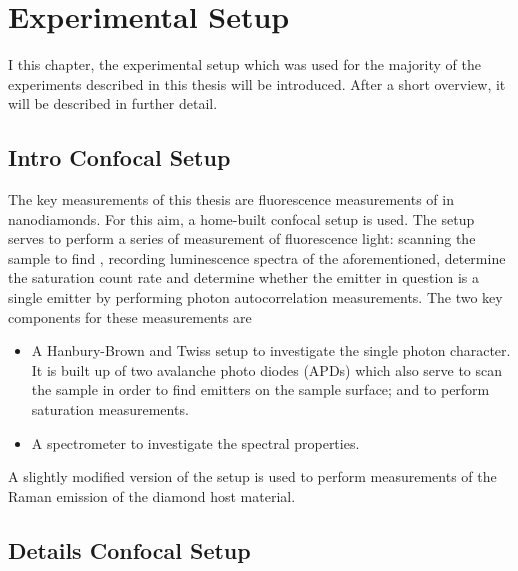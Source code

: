 
\chapter{Experimental Setup}	\label{ch::experimental_setup}

	I this chapter, the experimental setup which was used for the majority of the experiments described in this thesis will be introduced. 
	After a short overview, it will be described in further detail.




	\section{Intro Confocal Setup}

	The key measurements of this thesis are fluorescence measurements of \sivs in nanodiamonds.
	For this aim, a home-built confocal setup is used.
	The setup serves to perform a series of measurement of fluorescence light: scanning the sample to find \sivs, recording luminescence spectra of the aforementioned, determine the saturation count rate and determine whether the emitter in question is a single emitter by performing photon autocorrelation measurements.
	The two key components for these measurements are 

	\begin{itemize}
		\item A Hanbury-Brown and Twiss setup to investigate the single photon character. It is built up of two avalanche photo diodes (APDs) which also serve to scan the sample in order to find emitters on the sample surface; and to perform saturation measurements.
		\item A spectrometer to investigate the spectral properties.
	\end{itemize}

	A slightly modified version of the setup is used to perform measurements of the Raman emission of the diamond host material.




	\section{Details Confocal Setup}

